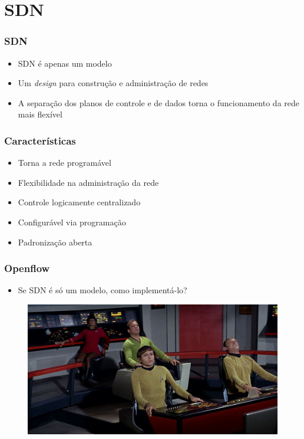 \section{SDN}



%
%
\begin{frame}\frametitle{SDN}

    \begin{itemize}
    \item SDN é apenas um modelo
    \vspace*{0.5cm}
    \item Um \emph{design} para construção e administração de redes
    \vspace*{0.5cm}
    \item A separação dos planos de controle e de dados torna o 
          funcionamento da rede mais flexível
    \end{itemize}
\end{frame}

%
%
\begin{frame}\frametitle{Características}

    \begin{itemize}
    \item Torna a rede programável
    \vspace*{0.1cm}
    \item Flexibilidade na administração da rede
    \vspace*{0.1cm}
    \item Controle logicamente centralizado
    \vspace*{0.1cm}
    \item Configurável via programação
    \vspace*{0.1cm}
    \item Padronização aberta 
    \end{itemize}
\end{frame}


%
%
\begin{frame}\frametitle{Openflow}

    \begin{itemize}
    \item Se SDN é só um modelo, como implementá-lo?
    \end{itemize}
    	\begin{figure}[h]
        \centering
        \includegraphics[scale=0.5]{images/control-room.png}
    \end{figure}
\end{frame}



